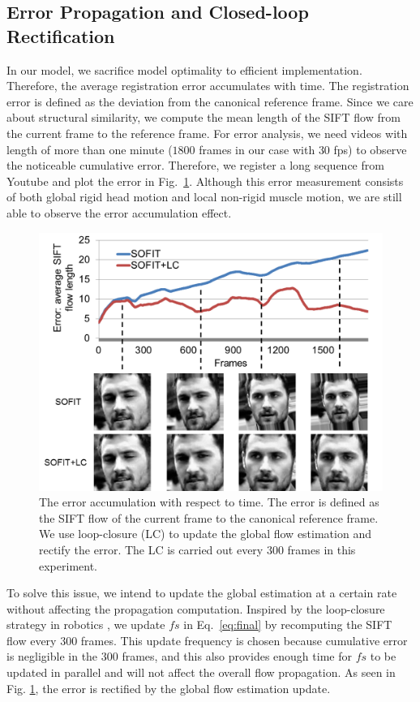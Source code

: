 \documentclass[10pt,journal]{IEEEtran}
\begin{document}
\subsection{\label{sec:details}Error Propagation and Closed-loop Rectification}

In our model, we sacrifice model optimality to efficient implementation. Therefore, the average registration error accumulates with time. The registration error is defined as the deviation from the canonical reference frame. Since we care about structural similarity, we compute the mean length of the SIFT flow from the current frame to the reference frame. For error analysis, we need videos with length of more than one minute ($1800$ frames in our case with $30$ fps) to observe the noticeable cumulative error. Therefore, we register a long sequence from Youtube and plot the error in Fig.~\ref{fig_error_prop}. Although this error measurement consists of both global rigid head motion and local non-rigid muscle motion, we are still able to observe the error accumulation effect.

\begin{figure}[htbp]
	\centering
		\includegraphics[width=\columnwidth]{fig/error_prop.png}
	\caption{The error accumulation with respect to time. The error is defined as the SIFT flow of the current frame to the canonical reference frame. We use loop-closure (LC) to update the global flow estimation and rectify the error. The LC is carried out every $300$ frames in this experiment.}
	\label{fig_error_prop}
\end{figure}

To solve this issue, we intend to update the global estimation at a certain rate without affecting the propagation computation. Inspired by the loop-closure strategy in robotics \cite{close_loop_icra_05}, we update $fs$ in Eq.~\eqref{eq:final} by recomputing the SIFT flow every $300$ frames. This update frequency is chosen because cumulative error is negligible in the $300$ frames, and this also provides enough time for $fs$ to be updated in parallel and will not affect the overall flow propagation. As seen in Fig. \ref{fig_error_prop}, the error is rectified by the global flow estimation update. 
\end{document}
